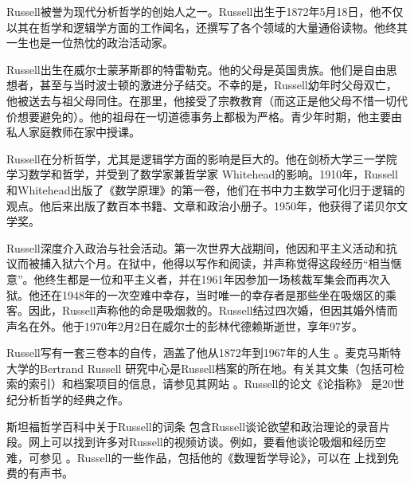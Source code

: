 \documentclass[../../../include/open-logic-section]{subfiles}
\begin{document}



Russell被誉为现代分析哲学的创始人之一。Russell出生于1872年5月18日，他不仅以其在哲学和逻辑学方面的工作闻名，还撰写了各个领域的大量通俗读物。他终其一生也是一位热忱的政治活动家。

Russell出生在威尔士蒙茅斯郡的特雷勒克。他的父母是英国贵族。他们是自由思想者，甚至与当时波士顿的激进分子结交。不幸的是，Russell幼年时父母双亡，他被送去与祖父母同住。在那里，他接受了宗教教育（而这正是他父母不惜一切代价想要避免的）。他的祖母在一切道德事务上都极为严格。青少年时期，他主要由私人家庭教师在家中授课。

Russell在分析哲学，尤其是逻辑学方面的影响是巨大的。他在剑桥大学三一学院学习数学和哲学，并受到了数学家兼哲学家 Whitehead的影响。1910年，Russell和Whitehead出版了《数学原理》的第一卷，他们在书中力主数学可化归于逻辑的观点。他后来出版了数百本书籍、文章和政治小册子。1950年，他获得了诺贝尔文学奖。

Russell深度介入政治与社会活动。第一次世界大战期间，他因和平主义活动和抗议而被捕入狱六个月。在狱中，他得以写作和阅读，并声称觉得这段经历“相当惬意”。他终生都是一位和平主义者，并在1961年因参加一场核裁军集会而再次入狱。他还在1948年的一次空难中幸存，当时唯一的幸存者是那些坐在吸烟区的乘客。因此，Russell声称他的命是吸烟救的。Russell结过四次婚，但因其婚外情而声名在外。他于1970年2月2日在威尔士的彭林代德赖斯逝世，享年97岁。

\begin{reading}
Russell写有一套三卷本的自传，涵盖了他从1872年到1967年的人生 \citep{Russell1967,Russell1968,Russell1969}。麦克马斯特大学的Bertrand Russell 研究中心是Russell档案的所在地。有关其文集（包括可检索的索引）和档案项目的信息，请参见其网站 \citet{Duncan2015}。Russell的论文《论指称》 \citep{Russell1905} 是20世纪分析哲学的经典之作。

斯坦福哲学百科中关于Russell的词条 \citep{Irvine2015} 包含Russell谈论欲望和政治理论的录音片段。网上可以找到许多对Russell的视频访谈。例如，要看他谈论吸烟和经历空难，可参见 \citet{RussellND}。Russell的一些作品，包括他的《数理哲学导论》，可以在 \citet{LibriVoxND} 上找到免费的有声书。
\end{reading}
\end{document}
